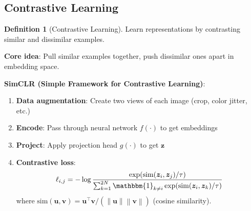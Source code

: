 \documentclass[11pt,twoside]{article}
\numberwithin{equation}{section}
\newcommand{\vect}[1]{\bm{#1}}
\newcommand{\norm}[1]{\left\lVert#1\right\rVert}
\theoremstyle{plain}
\theoremstyle{definition}
\newtheorem{definition}[theorem]{Definition}
\theoremstyle{remark}
\begin{document}
\subsection{Contrastive Learning}

\begin{definition}[Contrastive Learning]
Learn representations by contrasting similar and dissimilar examples.

\textbf{Core idea}: Pull similar examples together, push dissimilar ones apart in embedding space.

\textbf{SimCLR (Simple Framework for Contrastive Learning)}:
\begin{enumerate}
\item \textbf{Data augmentation}: Create two views of each image (crop, color jitter, etc.)
\item \textbf{Encode}: Pass through neural network $f(\cdot)$ to get embeddings
\item \textbf{Project}: Apply projection head $g(\cdot)$ to get $\vect{z}$
\item \textbf{Contrastive loss}:
\[
\ell_{i,j} = -\log \frac{\exp(\text{sim}(\vect{z}_i, \vect{z}_j)/\tau)}{\sum_{k=1}^{2N} \mathbbm{1}_{k \neq i} \exp(\text{sim}(\vect{z}_i, \vect{z}_k)/\tau)}
\]
where $\text{sim}(\vect{u}, \vect{v}) = \vect{u}^\top\vect{v} / (\norm{\vect{u}}\norm{\vect{v}})$ (cosine similarity).
\end{enumerate}
\end{definition}
\end{document}
